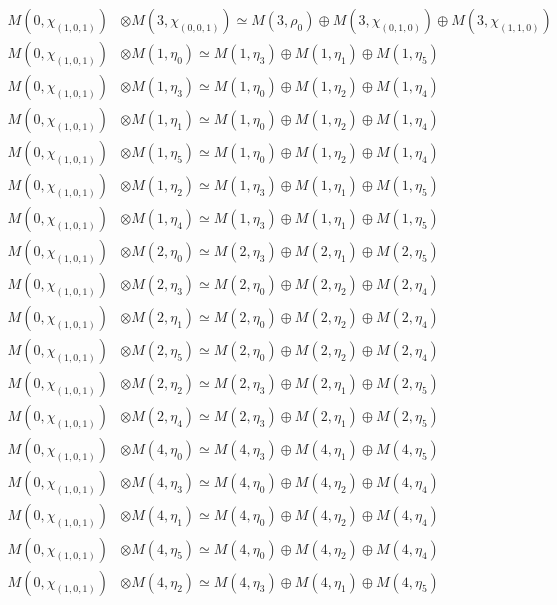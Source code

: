 \begin{align*}
M(0,\chi_{(1,0,1)}) &\otimes M(3,\chi_{(0,0,1)}) \simeq M(3,\rho_{0}) \oplus M(3,\chi_{(0,1,0)}) \oplus M(3,\chi_{(1,1,0)})\\
M(0,\chi_{(1,0,1)}) &\otimes M(1,\eta_{0}) \simeq M(1,\eta_{3}) \oplus M(1,\eta_{1}) \oplus M(1,\eta_{5})\\
M(0,\chi_{(1,0,1)}) &\otimes M(1,\eta_{3}) \simeq M(1,\eta_{0}) \oplus M(1,\eta_{2}) \oplus M(1,\eta_{4})\\
M(0,\chi_{(1,0,1)}) &\otimes M(1,\eta_{1}) \simeq M(1,\eta_{0}) \oplus M(1,\eta_{2}) \oplus M(1,\eta_{4})\\
M(0,\chi_{(1,0,1)}) &\otimes M(1,\eta_{5}) \simeq M(1,\eta_{0}) \oplus M(1,\eta_{2}) \oplus M(1,\eta_{4})\\
M(0,\chi_{(1,0,1)}) &\otimes M(1,\eta_{2}) \simeq M(1,\eta_{3}) \oplus M(1,\eta_{1}) \oplus M(1,\eta_{5})\\
M(0,\chi_{(1,0,1)}) &\otimes M(1,\eta_{4}) \simeq M(1,\eta_{3}) \oplus M(1,\eta_{1}) \oplus M(1,\eta_{5})\\
M(0,\chi_{(1,0,1)}) &\otimes M(2,\eta_{0}) \simeq M(2,\eta_{3}) \oplus M(2,\eta_{1}) \oplus M(2,\eta_{5})\\
M(0,\chi_{(1,0,1)}) &\otimes M(2,\eta_{3}) \simeq M(2,\eta_{0}) \oplus M(2,\eta_{2}) \oplus M(2,\eta_{4})\\
M(0,\chi_{(1,0,1)}) &\otimes M(2,\eta_{1}) \simeq M(2,\eta_{0}) \oplus M(2,\eta_{2}) \oplus M(2,\eta_{4})\\
M(0,\chi_{(1,0,1)}) &\otimes M(2,\eta_{5}) \simeq M(2,\eta_{0}) \oplus M(2,\eta_{2}) \oplus M(2,\eta_{4})\\
M(0,\chi_{(1,0,1)}) &\otimes M(2,\eta_{2}) \simeq M(2,\eta_{3}) \oplus M(2,\eta_{1}) \oplus M(2,\eta_{5})\\
M(0,\chi_{(1,0,1)}) &\otimes M(2,\eta_{4}) \simeq M(2,\eta_{3}) \oplus M(2,\eta_{1}) \oplus M(2,\eta_{5})\\
M(0,\chi_{(1,0,1)}) &\otimes M(4,\eta_{0}) \simeq M(4,\eta_{3}) \oplus M(4,\eta_{1}) \oplus M(4,\eta_{5})\\
M(0,\chi_{(1,0,1)}) &\otimes M(4,\eta_{3}) \simeq M(4,\eta_{0}) \oplus M(4,\eta_{2}) \oplus M(4,\eta_{4})\\
M(0,\chi_{(1,0,1)}) &\otimes M(4,\eta_{1}) \simeq M(4,\eta_{0}) \oplus M(4,\eta_{2}) \oplus M(4,\eta_{4})\\
M(0,\chi_{(1,0,1)}) &\otimes M(4,\eta_{5}) \simeq M(4,\eta_{0}) \oplus M(4,\eta_{2}) \oplus M(4,\eta_{4})\\
M(0,\chi_{(1,0,1)}) &\otimes M(4,\eta_{2}) \simeq M(4,\eta_{3}) \oplus M(4,\eta_{1}) \oplus M(4,\eta_{5})\\

\end{align*}
